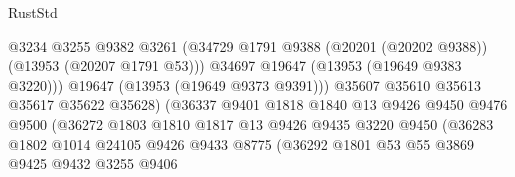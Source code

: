 \begin{lexlean}{RustStd}
\begin{coremodule}
                                          @3234
                                          @3255
                                          @9382
                                          @3261
                                          (@34729
                                            @1791
                                            @9388
                                            (@20201 (@20202 @9388))
                                            (@13953 (@20207 @1791 @53)))
                                          @34697
                                          @19647
                                          (@13953 (@19649 @9383 @3220)))
                                        @19647
                                        (@13953 (@19649 @9373 @9391)))
                                      @35607
                                      @35610
                                      @35613
                                      @35617
                                      @35622
                                      @35628)
                                    (@36337
                                      @9401
                                      @1818
                                      @1840
                                      @13
                                      @9426
                                      @9450
                                      @9476
                                      @9500
                                      (@36272
                                        @1803
                                        @1810
                                        @1817
                                        @13
                                        @9426
                                        @9435
                                        @3220
                                        @9450
                                        (@36283
                                          @1802
                                          @1014
                                          @24105
                                          @9426
                                          @9433
                                          @8775
                                          (@36292
                                            @1801
                                            @53
                                            @55
                                            @3869
                                            @9425
                                            @9432
                                            @3255
                                            @9406

\end{coremodule}
\end{lexlean}
